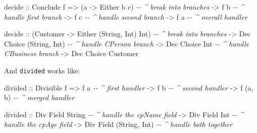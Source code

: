 \documentclass[]{article}
\newenvironment{Shaded}{}{}
\newcommand{\CommentTok}[1]{\textcolor[rgb]{0.38,0.63,0.69}{\textit{#1}}}
\newcommand{\DataTypeTok}[1]{\textcolor[rgb]{0.56,0.13,0.00}{#1}}
\newcommand{\NormalTok}[1]{#1}
\newcommand{\OtherTok}[1]{\textcolor[rgb]{0.00,0.44,0.13}{#1}}
\begin{document}
\begin{Shaded}
\begin{Highlighting}[]
\NormalTok{decide}
\OtherTok{    ::} \DataTypeTok{Conclude}\NormalTok{ f}
    \OtherTok{=>}\NormalTok{ (a }\OtherTok{{-}>} \DataTypeTok{Either}\NormalTok{ b c)    }\CommentTok{{-}{-} \^{} break into branches}
    \OtherTok{{-}>}\NormalTok{ f b                  }\CommentTok{{-}{-} \^{} handle first branch}
    \OtherTok{{-}>}\NormalTok{ f c                  }\CommentTok{{-}{-} \^{} handle second branch}
    \OtherTok{{-}>}\NormalTok{ f a                  }\CommentTok{{-}{-} \^{} overall handler}

\NormalTok{decide}
\OtherTok{    ::}\NormalTok{ (}\DataTypeTok{Customer} \OtherTok{{-}>} \DataTypeTok{Either}\NormalTok{ (}\DataTypeTok{String}\NormalTok{, }\DataTypeTok{Int}\NormalTok{) }\DataTypeTok{Int}\NormalTok{)   }\CommentTok{{-}{-} \^{} break into branches}
    \OtherTok{{-}>} \DataTypeTok{Dec} \DataTypeTok{Choice}\NormalTok{ (}\DataTypeTok{String}\NormalTok{, }\DataTypeTok{Int}\NormalTok{)                 }\CommentTok{{-}{-} \^{} handle CPerson branch}
    \OtherTok{{-}>} \DataTypeTok{Dec} \DataTypeTok{Choice} \DataTypeTok{Int}                           \CommentTok{{-}{-} \^{} handle CBusiness branch}
    \OtherTok{{-}>} \DataTypeTok{Dec} \DataTypeTok{Choice} \DataTypeTok{Customer}
\end{Highlighting}
\end{Shaded}

And \texttt{divided} works like:

\begin{Shaded}
\begin{Highlighting}[]
\NormalTok{divided}
\OtherTok{    ::} \DataTypeTok{Divisible}\NormalTok{ f}
    \OtherTok{=>}\NormalTok{ f a          }\CommentTok{{-}{-} \^{} first handler}
    \OtherTok{{-}>}\NormalTok{ f b          }\CommentTok{{-}{-} \^{} second handler}
    \OtherTok{{-}>}\NormalTok{ f (a, b)     }\CommentTok{{-}{-} \^{} merged handler}

\NormalTok{divided}
\OtherTok{    ::} \DataTypeTok{Div} \DataTypeTok{Field} \DataTypeTok{String}          \CommentTok{{-}{-} \^{} handle the cpName field}
    \OtherTok{{-}>} \DataTypeTok{Div} \DataTypeTok{Field} \DataTypeTok{Int}             \CommentTok{{-}{-} \^{} handle the cpAge field}
    \OtherTok{{-}>} \DataTypeTok{Div} \DataTypeTok{Field}\NormalTok{ (}\DataTypeTok{String}\NormalTok{, }\DataTypeTok{Int}\NormalTok{)   }\CommentTok{{-}{-} \^{} handle both together}
\end{Highlighting}
\end{Shaded}
\end{document}
